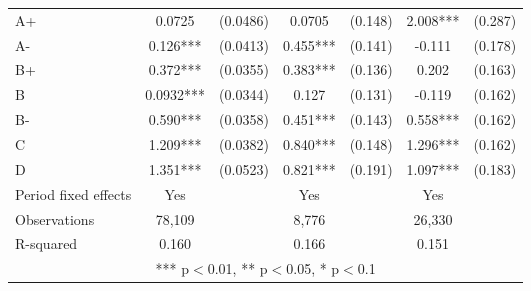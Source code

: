 \documentclass[12pt]{article}
\begin{document}
\begin{table}[H]
{\begin{tabular}{lcccccc}
    A+ & 0.0725 & (0.0486) & 0.0705 & (0.148) & 2.008*** & (0.287) \\
    A- & 0.126*** & (0.0413) & 0.455*** & (0.141) & -0.111 & (0.178) \\
    B+ & 0.372*** & (0.0355) & 0.383*** & (0.136) & 0.202 & (0.163) \\
    B & 0.0932*** & (0.0344) & 0.127 & (0.131) & -0.119 & (0.162) \\
    B- & 0.590*** & (0.0358) & 0.451*** & (0.143) & 0.558*** & (0.162) \\
    C & 1.209*** & (0.0382) & 0.840*** & (0.148) & 1.296*** & (0.162) \\
    D & 1.351*** & (0.0523) & 0.821*** & (0.191) & 1.097*** & (0.183) \\
    \midrule
    Period fixed effects & Yes & & Yes & & Yes & \\
    Observations & 78,109 & & 8,776 & & 26,330 & \\
    R-squared & 0.160 & & 0.166 & & 0.151 & \\
    \bottomrule
    \multicolumn{7}{c}{*** p$<$0.01, ** p$<$0.05, * p$<$0.1} \\
    \end{tabular}%
    }
\end{table}
\end{document}
